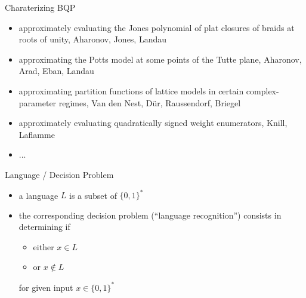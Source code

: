 \documentclass[slideColor]{prosper}
\renewcommand{\>}{\rangle}
\newcommand{\<}{\langle}
\begin{document}

\begin{slide}{Charaterizing BQP}

\begin{itemize}
\item approximately evaluating the Jones polynomial of plat closures of braids at roots of unity, Aharonov, Jones, Landau

\medskip
\item approximating the Potts model at some points of the Tutte plane, Aharonov, Arad, Eban, Landau

\medskip
\item approximating partition functions of lattice models in certain complex-parameter regimes, Van den Nest, D{\"u}r, Raussendorf, Briegel

\medskip
\item approximately evaluating quadratically signed weight enumerators, Knill, Laflamme

\medskip
\item ...

\end{itemize}

\end{slide}


\begin{slide}{Language / Decision Problem}

\begin{itemize}
\item a language $L$ is a subset of $\{0,1\}^*$

\medskip
\item the corresponding decision problem (``language recognition'') consists in determining if

\medskip
\begin{itemize}
\item either $x\in L$ 

\medskip
\item or $x\not\in L$ 
\end{itemize}

\medskip
for given input $x\in\{0,1\}^*$
\end{itemize}
\end{slide}

\end{document}
